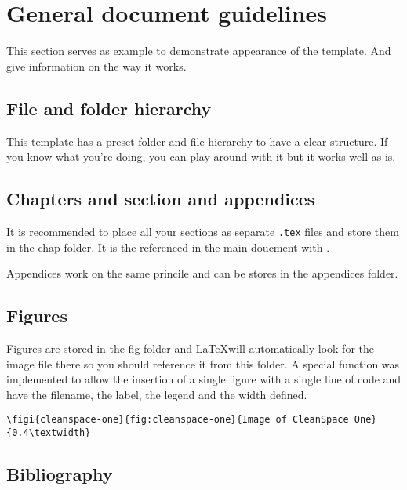 \section{General document guidelines}

    This section serves as example to demonstrate appearance of the template. And give information on the way it works.

    \subsection{File and folder hierarchy}

        This template has a preset folder and file hierarchy to have a clear structure. If you know what you're doing, you can play around with it but it works well as is.

        \subsection{Chapters and section and appendices}

            It is recommended to place all your sections as separate \texttt{.tex} files and store them in the chap folder. It is the referenced in the main doucment with \verb''.

            Appendices work on the same princile and can be stores in the appendices folder.

        \subsection{Figures}

            Figures are stored in the fig folder and \LaTeX will automatically look for the image file there so you should reference it from this folder. A special function was implemented to allow the insertion of a single figure with a single line of code and have the filename, the label, the legend and the width defined.

            {\scriptsize\verb'\figi{cleanspace-one}{fig:cleanspace-one}{Image of CleanSpace One}{0.4\textwidth}'}



    \subsection{Bibliography}

